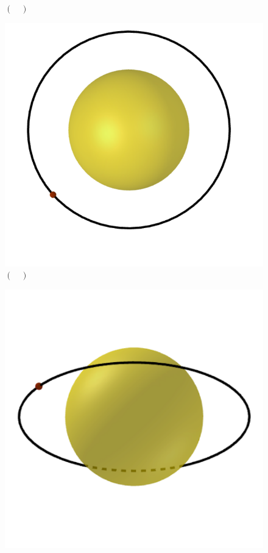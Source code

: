\documentclass[a4paper, 12pt]{article}
\begin{document}
\begin{flushleft}
\begin{itemize}
\begin{itemize}
\begin{multicols}{3}
\begin{figure}[H]
							\captionsetup{labelformat=empty}
							\caption{$(\quad)$}
						\end{figure}
						\begin{figure}[H]
							\centering
							\includegraphics[scale=0.2]{./img/5b5.png}
							\captionsetup{labelformat=empty}
							\caption{$(\quad)$}
						\end{figure}
						\begin{figure}[H]
							\centering
							\includegraphics[scale=0.2]{./img/5b6.png}

\end{figure}
\end{multicols}
\end{itemize}
\end{itemize}
\end{flushleft}
\end{document}

